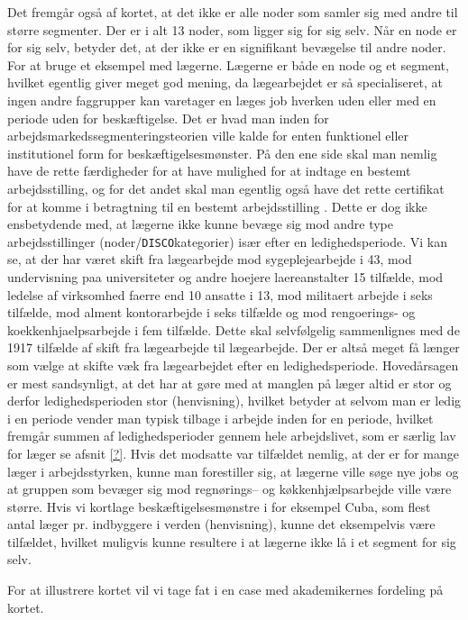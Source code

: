 Det fremgår også af kortet, at det ikke er alle noder som samler sig med andre til større segmenter. Der er i alt 13 noder, som ligger sig for sig selv. Når en node er for sig selv, betyder det, at der ikke er en signifikant bevægelse til andre noder. For at bruge et eksempel med lægerne. Lægerne er både en node og et segment, hvilket egentlig giver meget god mening, da lægearbejdet er så specialiseret, at ingen andre faggrupper kan varetager en læges job hverken uden eller med en periode uden for beskæftigelse. Det er hvad man inden for arbejdsmarkedssegmenteringsteorien ville kalde for enten funktionel eller institutionel form for beskæftigelsesmønster. På den ene side skal man nemlig have de rette færdigheder for at have mulighed for at indtage en bestemt arbejdsstilling, og for det andet skal man egentlig også have det rette certifikat for at komme i betragtning til en bestemt arbejdsstilling \parencite[3]{TouboelLarsenJensen2013} \parencite[4]{TouboelLarsen2015}. Dette er dog ikke ensbetydende med, at lægerne ikke kunne bevæge sig mod andre type arbejdsstillinger (noder/\texttt{DISCO}kategorier) især efter en ledighedsperiode. Vi kan se, at der har været skift fra lægearbejde mod sygeplejearbejde i 43, mod undervisning paa universiteter og andre hoejere laereanstalter 15 tilfælde, mod ledelse af virksomhed faerre end 10 ansatte i 13, mod militaert arbejde i seks tilfælde, mod alment kontorarbejde i seks tilfælde og mod rengoerings- og koekkenhjaelpsarbejde i fem tilfælde. Dette skal selvfølgelig sammenlignes med de 1917 tilfælde af skift fra lægearbejde til lægearbejde. Der er altså meget få længer som vælge at skifte væk fra lægearbejdet efter en ledighedsperiode. Hovedårsagen er mest sandsynligt, at det har at gøre med at manglen på læger altid er stor og derfor ledighedsperioden stor (henvisning), hvilket betyder at selvom man er ledig i en periode vender man typisk tilbage i arbejde inden for en periode, hvilket fremgår summen af ledighedsperioder gennem hele arbejdslivet, som er særlig lav for læger se afsnit \ref{?}. Hvis det modsatte var tilfældet nemlig, at der er for mange læger i arbejdsstyrken, kunne man forestiller sig, at lægerne ville søge nye jobs og at gruppen som bevæger sig mod regnørings-- og køkkenhjælpsarbejde ville være større. Hvis vi kortlage beskæftigelsesmønstre i for eksempel Cuba, som flest antal læger pr. indbyggere i verden (henvisning), kunne det eksempelvis være tilfældet, hvilket muligvis kunne resultere i at lægerne ikke lå i et segment for sig selv.

For at illustrere kortet vil vi tage fat i en case med akademikernes fordeling på kortet.


